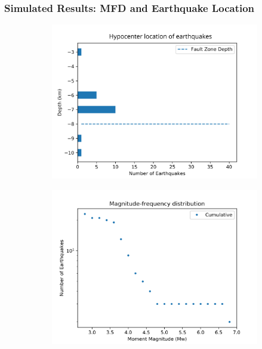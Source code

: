 \documentclass{beamer}
\begin{document}
\begin{frame}
    \frametitle{Simulated Results: MFD and Earthquake Location}
    \begin{figure}
        \begin{subfigure}[b]{0.5\textwidth}
            \includegraphics[width=\textwidth]{images/hypocenter1.png} 
        \end{subfigure}%
        \begin{subfigure}[b]{0.5\textwidth}
            \includegraphics[width=\textwidth]{images/mfd1.png}
        \end{subfigure}%
    \end{figure}
\end{frame}
\end{document}
